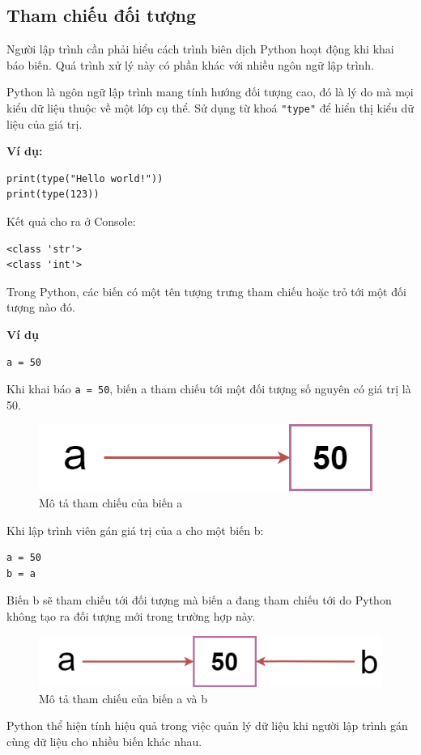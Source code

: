 \subsection{Tham chiếu đối tượng}
Người lập trình cần phải hiểu cách trình biên dịch Python hoạt động khi khai báo biến. Quá trình xử lý này có phần khác với nhiều ngôn ngữ lập trình.\par
Python là ngôn ngữ lập trình mang tính hướng đối tượng cao, đó là lý do mà mọi kiểu dữ liệu thuộc về một lớp cụ thể. Sử dụng từ khoá \texttt{"type"} để hiển thị kiểu dữ liệu của giá trị.\par
\textbf{Ví dụ:}\\
\begin{lstlisting}
print(type("Hello world!"))
print(type(123))
\end{lstlisting}
Kết quả cho ra ở Console:\\
\begin{lstlisting}
<class 'str'>
<class 'int'>
\end{lstlisting}
Trong Python, các biến có một tên tượng trưng tham chiếu hoặc trỏ tới một đối tượng nào đó.\par
\textbf{Ví dụ}\\
\begin{lstlisting}
a = 50
\end{lstlisting}
Khi khai báo \texttt{a = 50}, biến a tham chiếu tới một đối tượng số nguyên có giá trị là 50.
\begin{figure}[h]
	\centering
	\includegraphics[width=0.7\linewidth]{img/ref1}
	\caption{Mô tả tham chiếu của biến a}
\end{figure}\par
Khi lập trình viên gán giá trị của a cho một biến b:\\
\begin{lstlisting}
a = 50
b = a
\end{lstlisting}
Biến b sẽ tham chiếu tới đối tượng mà biến a đang tham chiếu tới do Python không tạo ra đối tượng mới trong trường hợp này.
\begin{figure}[h]
	\centering
	\includegraphics[width=0.7\linewidth]{img/ref2}
	\caption{Mô tả tham chiếu của biến a và b}
\end{figure}\par
Python thể hiện tính hiệu quả trong việc quản lý dữ liệu khi người lập trình gán cùng dữ liệu cho nhiều biến khác nhau.
\newpage
